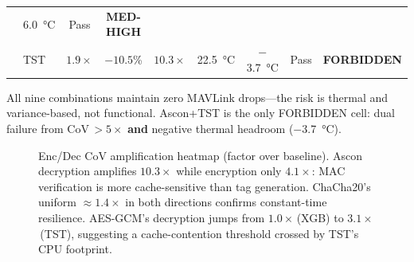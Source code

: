 \begin{table}[!t]
\begin{tabular}{@{}ll c c c c c c c@{}}
    & \SI{6.0}{\degreeCelsius}
    & \cellcolor{ptblue!8}Pass
    & \cellcolor{ptgold!15}\textbf{MED-HIGH} \\
  & \cellcolor{ptrose!20}TST
    & \cellcolor{ptrose!20}$1.9\times$
    & \cellcolor{ptrose!20}$-10.5$\%
    & \cellcolor{ptrose!20}$10.3\times$
    & \cellcolor{ptrose!20}\SI{22.5}{\degreeCelsius}
    & \cellcolor{ptrose!20}$-$\SI{3.7}{\degreeCelsius}
    & \cellcolor{ptrose!20}Pass
    & \cellcolor{ptrose!20}\textbf{FORBIDDEN} \\
\bottomrule
\end{tabular}
\begin{tablenotes}
\footnotesize
\item All nine combinations maintain zero MAVLink drops---the risk
  is thermal and variance-based, not functional.  Ascon+TST is the
  only FORBIDDEN cell: dual failure from CoV\,$>5\times$ \textbf{and}
  negative thermal headroom ($-$\SI{3.7}{\degreeCelsius}).
\end{tablenotes}
\end{table}

\begin{figure}[!t]
\centering
{}
\caption{Enc/Dec CoV amplification heat\-map (factor over baseline).
  Ascon decryption amplifies $10.3\times$ while encryption only
  $4.1\times$: MAC verification is more cache-sensitive than tag
  generation.  ChaCha20's uniform $\approx$$1.4\times$ in both
  directions confirms constant-time resilience.  AES-GCM's decryption
  jumps from $1.0\times$\,(XGB) to $3.1\times$\,(TST), suggesting
  a cache-contention threshold crossed by TST's CPU footprint.}
\label{fig:asymmetric_heatmap}
\end{figure}

